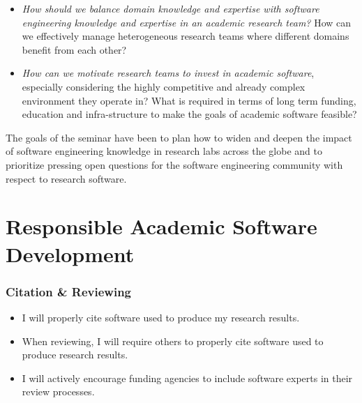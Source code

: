 \documentclass[a4paper,UKenglish]{dagman}
\renewcommand{\paragraph}[1]{\subsubsection*{#1}\xspace}
\begin{document}
\begin{itemize}
\item \emph{How should we balance domain knowledge and expertise with software engineering knowledge and expertise in an academic research team?} How can we effectively manage heterogeneous research teams where different domains benefit from each other?   
\item \emph{How can we motivate research teams to invest in academic software}, especially considering the highly competitive and already complex environment they operate in?
What is required in terms of long term funding, education and infra-structure to make the goals of academic software feasible?
\end{itemize}

The goals of the seminar have been to plan how to widen and deepen the impact of software engineering knowledge in research labs across the globe and to prioritize pressing open questions for the software engineering community with respect to research software.

\section{Responsible Academic Software Development}



\paragraph{Citation \& Reviewing}
\begin{itemize}
\item I will properly cite software used to produce my research results.
\item When reviewing, I will require others to properly cite software used to produce research results.
\item I will actively encourage funding agencies to include software experts in their review processes.
\end{itemize}
\end{document}
